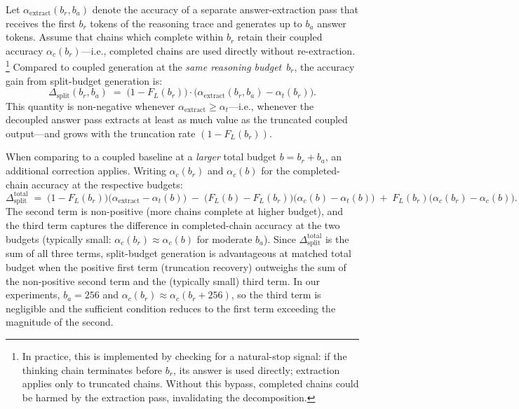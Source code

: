 \begin{proposition}
\label{prop:recoverable-tax}
Let $\alpha_{\mathrm{extract}}(b_r, b_a)$ denote the accuracy of a
separate answer-extraction pass that receives the first $b_r$ tokens
of the reasoning trace and generates up to $b_a$ answer tokens.
Assume that chains which complete within $b_r$ retain their coupled
accuracy $\alpha_c(b_r)$---i.e., completed chains are used directly
without re-extraction.%
\footnote{In practice, this is implemented by checking for a
natural-stop signal: if the thinking chain terminates before $b_r$,
its answer is used directly; extraction applies only to truncated chains.
Without this bypass, completed chains could be harmed by the extraction
pass, invalidating the decomposition.}
Compared to coupled generation at the \emph{same reasoning budget}~$b_r$,
the accuracy gain from split-budget generation is:
\begin{equation}
  \Delta_{\mathrm{split}}(b_r, b_a)
  \;=\;
  \bigl(1 - F_L(b_r)\bigr) \cdot
  \bigl(\alpha_{\mathrm{extract}}(b_r, b_a) - \alpha_t(b_r)\bigr).
  \label{eq:recoverable-tax}
\end{equation}
This quantity is non-negative whenever
$\alpha_{\mathrm{extract}} \ge \alpha_t$---i.e., whenever the
decoupled answer pass extracts at least as much value as the truncated
coupled output---and grows with the truncation rate $(1 - F_L(b_r))$.

When comparing to a coupled baseline at a \emph{larger} total budget
$b = b_r + b_a$, an additional correction applies.
Writing $\alpha_c(b_r)$ and $\alpha_c(b)$ for the completed-chain
accuracy at the respective budgets:
\begin{equation}
  \Delta_{\mathrm{split}}^{\mathrm{total}}
  \;=\;
  \bigl(1 - F_L(b_r)\bigr)
    \bigl(\alpha_{\mathrm{extract}} - \alpha_t(b)\bigr)
  \;-\;
  \bigl(F_L(b) - F_L(b_r)\bigr)
    \bigl(\alpha_c(b) - \alpha_t(b)\bigr)
  \;+\;
  F_L(b_r)\bigl(\alpha_c(b_r) - \alpha_c(b)\bigr).
  \label{eq:recoverable-tax-total}
\end{equation}
The second term is non-positive (more chains complete at higher budget),
and the third term captures the difference in completed-chain accuracy
at the two budgets (typically small: $\alpha_c(b_r) \approx \alpha_c(b)$
for moderate $b_a$).
Since $\Delta^{\mathrm{total}}_{\mathrm{split}}$ is the sum of all
three terms, split-budget generation is advantageous at matched total
budget when the positive first term (truncation recovery) outweighs the
sum of the non-positive second term and the (typically small) third term.
In our experiments, $b_a = 256$ and
$\alpha_c(b_r) \approx \alpha_c(b_r + 256)$, so the third term
is negligible and the sufficient condition reduces to
the first term exceeding the magnitude of the second.
\end{proposition}

